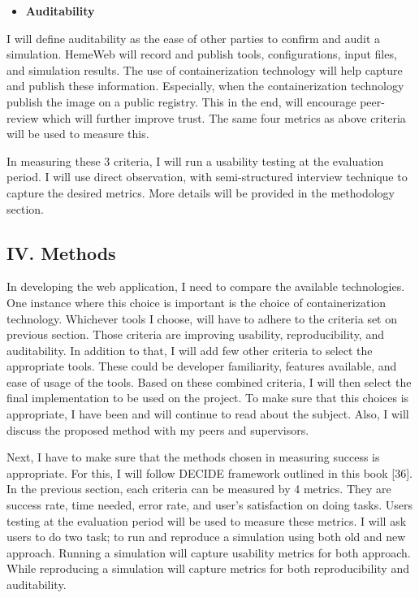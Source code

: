 \documentclass[]{article}
\providecommand{\tightlist}{%
  \setlength{\itemsep}{0pt}\setlength{\parskip}{0pt}}
\begin{document}
\begin{itemize}
\tightlist
\item
  \textbf{Auditability}
\end{itemize}

I will define auditability as the ease of other parties to confirm and
audit a simulation. HemeWeb will record and publish tools,
configurations, input files, and simulation results. The use of
containerization technology will help capture and publish these
information. Especially, when the containerization technology publish
the image on a public registry. This in the end, will encourage
peer-review which will further improve trust. The same four metrics as
above criteria will be used to measure this.

In measuring these 3 criteria, I will run a usability testing at the
evaluation period. I will use direct observation, with semi-structured
interview technique to capture the desired metrics. More details will be
provided in the methodology section.

\subsection{IV. Methods}\label{iv.-methods}

In developing the web application, I need to compare the available
technologies. One instance where this choice is important is the choice
of containerization technology. Whichever tools I choose, will have to
adhere to the criteria set on previous section. Those criteria are
improving usability, reproducibility, and auditability. In addition to
that, I will add few other criteria to select the appropriate tools.
These could be developer familiarity, features available, and ease of
usage of the tools. Based on these combined criteria, I will then select
the final implementation to be used on the project. To make sure that
this choices is appropriate, I have been and will continue to read about
the subject. Also, I will discuss the proposed method with my peers and
supervisors.

Next, I have to make sure that the methods chosen in measuring success
is appropriate. For this, I will follow DECIDE framework outlined in
this book {[}36{]}. In the previous section, each criteria can be
measured by 4 metrics. They are success rate, time needed, error rate,
and user's satisfaction on doing tasks. Users testing at the evaluation
period will be used to measure these metrics. I will ask users to do two
task; to run and reproduce a simulation using both old and new approach.
Running a simulation will capture usability metrics for both approach.
While reproducing a simulation will capture metrics for both
reproducibility and auditability.
\end{document}
